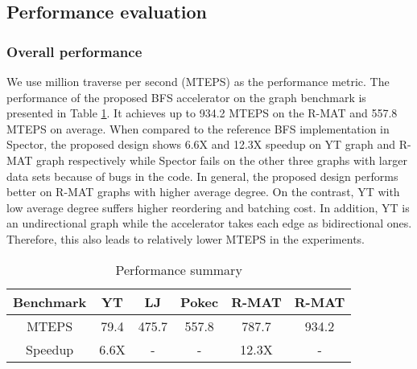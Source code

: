 \subsection{Performance evaluation}
\subsubsection{Overall performance}
We use million traverse per second (MTEPS) as 
the performance metric. The performance of the proposed BFS 
accelerator on the graph benchmark is 
presented in Table \ref{tab:performance-summary}. 
It achieves up to 934.2 MTEPS on the R-MAT\uppercase\expandafter{}
and 557.8 MTEPS on average. When compared to the reference BFS 
implementation in Spector, the proposed design shows 6.6X and 12.3X 
speedup on YT graph and R-MAT\uppercase\expandafter{} 
graph respectively while Spector fails on the other three graphs with larger data sets 
because of bugs in the code. In general, the proposed design performs better on 
R-MAT graphs with higher average degree. On the contrast, YT with 
low average degree suffers higher reordering and batching cost. In addition, 
YT is an undirectional graph while the accelerator takes each edge as bidirectional ones. 
Therefore, this also leads to relatively lower MTEPS in the experiments. 
\begin{table}
    \centering
  \caption{Performance summary}
  \label{tab:performance-summary}
  \begin{tabular}{cccccc}
    \toprule
      Benchmark & YT & LJ & Pokec & R-MAT\uppercase\expandafter{\romannumeral1} & R-MAT\uppercase\expandafter{\romannumeral2} \\
    \midrule
      MTEPS & 79.4 & 475.7 & 557.8 & 787.7 & 934.2 \\
      Speedup & 6.6X & - & - & 12.3X & - \\
  \bottomrule
\end{tabular}
\vspace{-1em}
\end{table}


